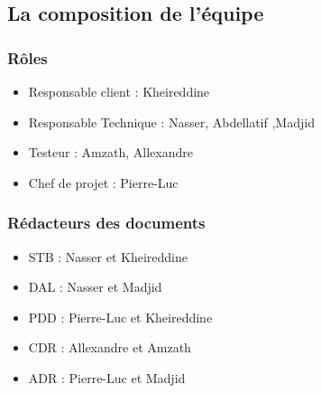 \documentclass{../res/adr}
\begin{document}
  \subsection{La composition de l'équipe}
    \subsubsection{Rôles}
      \begin{itemize}
        \item Responsable client : Kheireddine
        \item Responsable Technique : Nasser, Abdellatif ,Madjid
        \item Testeur : Amzath, Allexandre
        \item Chef de projet : Pierre-Luc
      \end{itemize}
    \subsubsection{Rédacteurs des documents}
      \begin{itemize}
        \item STB : Nasser et Kheireddine
        \item DAL : Nasser et Madjid
        \item PDD : Pierre-Luc et Kheireddine
        \item CDR : Allexandre et Amzath
        \item ADR : Pierre-Luc et Madjid
      \end{itemize}
\end{document}
